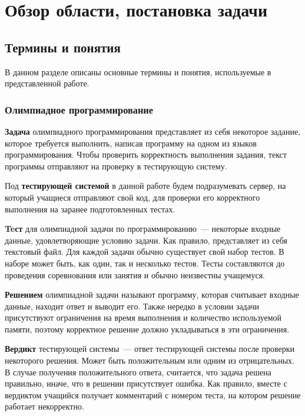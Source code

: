 \chapter{Обзор области, постановка задачи}

\section{Термины и понятия}

В данном разделе описаны основные термины и понятия, используемые в представленной работе.

\subsection{Олимпиадное программирование}


\textbf{Задача} олимпиадного программирования представляет из себя некоторое задание, которое требуется выполнить, написав
программу на одном из языков программирования. Чтобы проверить корректность выполнения задания, текст программы
отправляют на проверку в тестирующую систему.

Под \textbf{тестирующей системой} в данной работе будем подразумевать сервер, на который учащиеся отправляют свой код, 
для проверки его корректного выполнения на заранее подготовленных тестах.

\textbf{Teст} для олимпиадной задачи по программированию~--- некоторые входные данные, удовлетворяющие условию задачи.
Как правило, представляет из себя текстовый файл. Для каждой задачи обычно существует свой набор тестов. В наборе может быть,
как один, так и несколько тестов. Тесты составляются до проведения соревнования или занятия и обычно неизвестны учащемуся.

\textbf{Решением} олимпиадной задачи называют программу, которая считывает входные данные, находит ответ и выводит его.
Также нередко в условии задачи присутствуют ограничения на время выполнения и количество используемой памяти, поэтому
корректное решение должно укладываться в эти ограничения.

\textbf{Вердикт} тестирующей системы~--- ответ тестирующей системы после проверки некоторого решения. 
Может быть положительным или одним из отрицательных. 
В случае получения положительного ответа, считается, что задача решена правильно, иначе, что в решении присутствует ошибка.
Как правило, вместе с вердиктом учащийся получает комментарий с номером теста, на котором решение работает некорректно.

